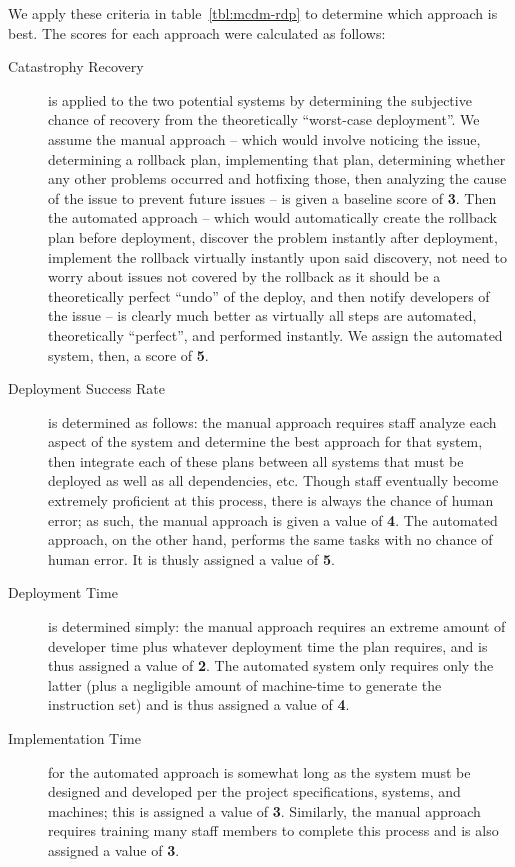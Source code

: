 \documentclass[12pt]{article}
\begin{document}
We apply these criteria in table~\ref{tbl:mcdm-rdp} to determine which approach is best. The scores for each approach were calculated as follows:
\begin{description}
\item[Catastrophy Recovery] is applied to the two potential systems by determining the subjective chance of recovery from the theoretically ``worst-case deployment''. We assume the manual approach -- which would involve noticing the issue, determining a rollback plan, implementing that plan, determining whether any other problems occurred and hotfixing those, then analyzing the cause of the issue to prevent future issues -- is given a baseline score of {\bf 3}. Then the automated approach -- which would automatically create the rollback plan before deployment, discover the problem instantly after deployment, implement the rollback virtually instantly upon said discovery, not need to worry about issues not covered by the rollback as it should be a theoretically perfect ``undo'' of the deploy, and then notify developers of the issue -- is clearly much better as virtually all steps are automated, theoretically ``perfect'', and performed instantly. We assign the automated system, then, a score of {\bf 5}.
\item[Deployment Success Rate] is determined as follows: the manual approach requires staff analyze each aspect of the system and determine the best approach for that system, then integrate each of these plans between all systems that must be deployed as well as all dependencies, etc. Though staff eventually become extremely proficient at this process, there is always the chance of human error; as such, the manual approach is given a value of {\bf 4}. The automated approach, on the other hand, performs the same tasks with no chance of human error. It is thusly assigned a value of {\bf 5}.
\item[Deployment Time] is determined simply: the manual approach requires an extreme amount of developer time plus whatever deployment time the plan requires, and is thus assigned a value of {\bf 2}. The automated system only requires only the latter (plus a negligible amount of machine-time to generate the instruction set) and is thus assigned a value of {\bf 4}.
\item[Implementation Time] for the automated approach is somewhat long as the system must be designed and developed per the project specifications, systems, and machines; this is assigned a value of {\bf 3}. Similarly, the manual approach requires training many staff members to complete this process and is also assigned a value of {\bf 3}.

\end{description}
\end{document}
